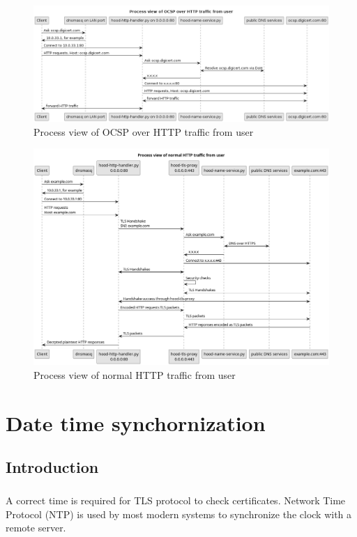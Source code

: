\documentclass[mscthesis]{usiinfthesis}
\begin{document}
\begin{figure}[H]
  \includegraphics[width=\textheight, angle=90]{graphics/puml/process-ocsp-traffic.png}
  \caption{Process view of OCSP over HTTP traffic from user}
  \label{fig:ocsp-process-view}
\end{figure}

\begin{figure}[H]
  \includegraphics[width=\textheight, angle=90]{graphics/puml/process-http-traffic.png}
  \caption{Process view of normal HTTP traffic from user}
  \label{fig:http-process-view}
\end{figure}

\chapter{Date time synchornization}
\section{Introduction}
\paragraph{}
A correct time is required for TLS protocol to check certificates. Network Time Protocol (NTP) is used by most modern systems to synchronize the clock with a remote server.
\end{document}
